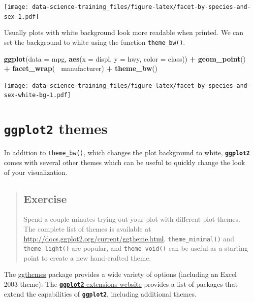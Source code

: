 \documentclass[]{book}
\newenvironment{Shaded}{\begin{snugshade}}{\end{snugshade}}
\newcommand{\KeywordTok}[1]{\textcolor[rgb]{0.13,0.29,0.53}{\textbf{#1}}}
\newcommand{\DataTypeTok}[1]{\textcolor[rgb]{0.13,0.29,0.53}{#1}}
\newcommand{\StringTok}[1]{\textcolor[rgb]{0.31,0.60,0.02}{#1}}
\newcommand{\OperatorTok}[1]{\textcolor[rgb]{0.81,0.36,0.00}{\textbf{#1}}}
\newcommand{\NormalTok}[1]{#1}
\theoremstyle{definition}
\theoremstyle{definition}
\theoremstyle{definition}
\theoremstyle{remark}
\begin{document}
\texttt{[image: data-science-training\_files/figure-latex/facet-by-species-and-sex-1.pdf]}

Usually plots with white background look more readable when printed. We
can set the background to white using the function \texttt{theme\_bw()}.

\begin{Shaded}
\begin{Highlighting}[]
 \KeywordTok{ggplot}\NormalTok{(}\DataTypeTok{data =}\NormalTok{ mpg, }\KeywordTok{aes}\NormalTok{(}\DataTypeTok{x =}\NormalTok{ displ, }\DataTypeTok{y =}\NormalTok{ hwy, }\DataTypeTok{color =}\NormalTok{ class)) }\OperatorTok{+}
\StringTok{     }\KeywordTok{geom_point}\NormalTok{() }\OperatorTok{+}
\StringTok{     }\KeywordTok{facet_wrap}\NormalTok{(}\OperatorTok{~}\StringTok{ }\NormalTok{manufacturer) }\OperatorTok{+}
\StringTok{     }\KeywordTok{theme_bw}\NormalTok{()}
\end{Highlighting}
\end{Shaded}

\texttt{[image: data-science-training\_files/figure-latex/facet-by-species-and-sex-white-bg-1.pdf]}

\section{\texorpdfstring{\textbf{\texttt{ggplot2}}
themes}{ggplot2 themes}}\label{ggplot2-themes}

In addition to \texttt{theme\_bw()}, which changes the plot background
to white, \textbf{\texttt{ggplot2}} comes with several other themes
which can be useful to quickly change the look of your visualization.

\begin{quote}
\subsection{Exercise}\label{exercise-2}

Spend a couple minutes trying out your plot with different plot themes.
The complete list of themes is available at
\url{http://docs.ggplot2.org/current/ggtheme.html}.
\texttt{theme\_minimal()} and \texttt{theme\_light()} are popular, and
\texttt{theme\_void()} can be useful as a starting point to create a new
hand-crafted theme.
\end{quote}

The
\href{https://cran.r-project.org/web/packages/ggthemes/vignettes/ggthemes.html}{ggthemes}
package provides a wide variety of options (including an Excel 2003
theme). The
\href{https://www.ggplot2-exts.org}{\textbf{\texttt{ggplot2}} extensions
website} provides a list of packages that extend the capabilities of
\textbf{\texttt{ggplot2}}, including additional themes.
\end{document}
